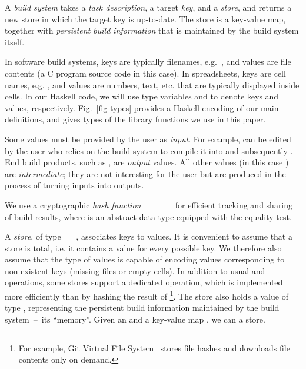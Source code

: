 A \emph{build system} takes a \emph{task description}, a target \emph{key},
and a \emph{store}, and returns a new store in which the target key is
up-to-date. The store is a key-value map, together with \emph{persistent build
information} that is maintained by the build system itself.

In software build systems, keys are typically filenames,
e.g.~, and values are file contents (a C program source
code in this case). In spreadsheets, keys are cell names,
e.g. , and values are numbers, text, etc. that are typically
displayed inside cells. In our Haskell code, we will use type
variables  and  to denote keys and values, respectively.
Fig.~\ref{fig-types} provides a Haskell encoding of our main definitions,
and gives types of the library functions we use in this paper.

Some values must be provided by the user as \emph{input}. For example,
 can be edited by the user who relies on the build system to
compile it into  and subsequently . End build products,
such as , are \emph{output} values. All other values (in this case
) are \emph{intermediate}; they are not interesting for the user
but are produced in the process of turning inputs into outputs.

We use a cryptographic \emph{hash function}
~\hs{::}~~~\hs{=>}~~\hs{->}~ for
efficient tracking and sharing of build results, where  is an abstract
data type equipped with the equality test.

A \emph{store}, of type ~~~, associates keys to
values. It is convenient to assume that a store is total, i.e. it contains a
value for every possible key. We therefore also assume that the type of values
is capable of encoding values corresponding to non-existent keys (missing files
or empty cells). In addition to usual  and  operations,
some stores support a dedicated  operation, which is implemented
more efficiently than by hashing the result of \footnote{For
example, Git Virtual File System~\cite{gvfs} stores file hashes and downloads
file contents only on demand.}. The store also holds a value of type ,
representing the persistent build information maintained by the build
system~--~its ``memory''. Given an  and a key-value map \store, we can
 a store.



